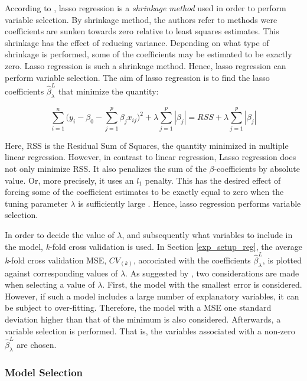 \newpar

According to \cite{ISLR}, lasso regression is a \textit{shrinkage method} used in order to perform variable selection. By shrinkage method, the authors refer to methods were coefficients are sunken towards zero relative to least squares estimates. This shrinkage has the effect of reducing variance. Depending on what type of shrinkage is performed, some of the coefficients may be estimated to be exactly zero. Lasso regression is such a shrinkage method. Hence, lasso regression can perform
variable selection. The aim of lasso regression is to find the lasso coefficients $\hat{\beta}_{\lambda}^{L}$ that minimize the quantity:

\begin{equation}
    \sum_{i=1}^n\Big (y_i-\beta_0-\sum_{j=1}^p\beta_jx_{ij}\Big)^2 + \lambda \sum_{j=1}^p|\beta_j| = RSS + \lambda \sum_{j=1}^p|\beta_j|
    \label{eq:lasso}
\end{equation}

Here, RSS is the Residual Sum of Squares, the quantity minimized in multiple linear regression. However, in contrast to linear regression, Lasso regression does not only minimize RSS. It also penalizes the sum of the $\beta$-coefficients by absolute value. Or, more precisely, it uses an $l_1$ penalty. This has the desired effect of forcing some of the coefficient estimates to be exactly equal to zero when the tuning parameter $\lambda$ is sufficiently large \citep{ISLR}. Hence, lasso regression performs variable selection.

\newpar 

In order to decide the value of $\lambda$, and subsequently what variables to include in the model, \textit{k}-fold cross validation is used. In Section \ref{exp_setup_reg}, the average \textit{k}-fold cross validation MSE, $CV_{(k)}$, accociated with the coefficients $\hat{\beta}_{\lambda}^{L}$, is plotted against corresponding values of $\lambda$. As suggested by \cite{ISLR}, two considerations are made when selecting a value of $\lambda$. First, the model with the smallest error is considered. However, if such a model includes a large number of explanatory variables, it can be subject to over-fitting. Therefore, the model with a MSE one standard deviation higher than that of the minimum is also considered. Afterwards, a variable selection is performed. That is, the variables associated with a non-zero $\hat{\beta}_{\lambda}^{L}$ are chosen. 

\subsubsection{Model Selection}

